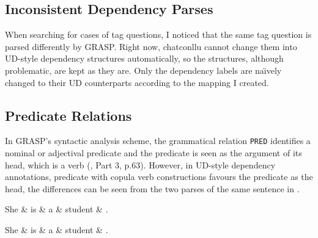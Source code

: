 \subsection{Inconsistent Dependency Parses}

When searching for cases of tag questions, I noticed that the same tag question is parsed differently by GRASP. Right now, chatconllu cannot change them into UD-style dependency structures automatically, so the structures, although problematic, are kept as they are. Only the dependency labels are na\"{\i}vely changed to their UD counterparts according to the mapping I created.

\subsection{Predicate Relations}

In GRASP's syntactic analysis scheme, the grammatical relation \texttt{PRED} identifies a nominal or adjectival predicate and the predicate is seen as the argument of its head, which is a verb (\cite{Macwhinney2000}, Part 3, p.63). However, in UD-style dependency annotations, predicate with copula verb constructions favours the predicate as the head, the differences can be seen from the two parses of the same sentence in .\\

\begin{minipage}[b]{0.5\linewidth}
\begin{dependency}
	\begin{deptext}[column sep=0.5cm]
	She \& is \& a \& student \& .\\
	\end{deptext}
\end{dependency}
\end{minipage}
\hfill
\begin{minipage}[b]{0.5\linewidth}
\begin{dependency}
	\begin{deptext}[column sep=0.5cm]
	She \& is \& a \& student \& .\\
	\end{deptext}
\end{dependency}
\end{minipage}\label{fig:copula}
\clearpage

